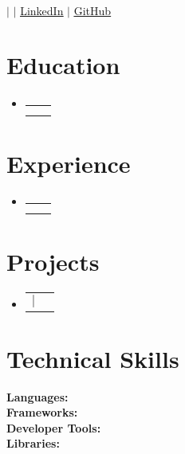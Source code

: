 \documentclass[letterpaper,11pt]{article}
\makeatletter
\newcommand{\resumeProjectHeading}[2]{
  \item
    \begin{tabular*}{0.97\textwidth}[t]{l@{\extracolsep{\fill}}r}
      \small#1 & #2 \\
    \end{tabular*}\vspace{-7pt}
}
\newcommand{\resumeSubheading}[4]{
  \vspace{-2pt}\item
    \begin{tabular*}{0.97\textwidth}[t]{l@{\extracolsep{\fill}}r}
      \textbf{\small#1} & #2 \\
      \textit{\small#3} & \textit{\small #4} \\
    \end{tabular*}\vspace{-7pt}
}
\newcommand{\resumeSubHeadingListStart}{\begin{itemize}[leftmargin=0.15in, label={}]}
\newcommand{\resumeSubHeadingListEnd}{\end{itemize}}
\newcommand{\resumeItemListStart}{\begin{itemize}}
\newcommand{\resumeItemListEnd}{\end{itemize}\vspace{-5pt}}
\makeatother
\begin{document}
\begin{center}
    \textbf{\Huge \scshape {}} \\  \vspace{1pt}
    \small {} $|$ \href{mailto:\VAR{email}}{\underline{}} $|$
    \href{\VAR{linkedin}}{\underline{LinkedIn}} $|$
    \href{\VAR{github}}{\underline{GitHub}}
\end{center}

\section{Education}
\resumeSubHeadingListStart
    \resumeSubheading
      {\VAR{edu.institution}}{\VAR{edu.location}}
      {\VAR{edu.degree}}{\VAR{edu.dates}}
\resumeSubHeadingListEnd


\section{Experience}
\resumeSubHeadingListStart
    \resumeSubheading
      {\VAR{job.title}}{\VAR{job.dates}}
      {\VAR{job.company}}{\VAR{job.location}}
    \resumeItemListStart
    \resumeItemListEnd
\resumeSubHeadingListEnd

\section{Projects}
\resumeSubHeadingListStart
    \resumeProjectHeading
      {\textbf{\VAR{project.name}} $|$ \emph{\VAR{project.tech}}}{\VAR{project.dates}}
      \resumeItemListStart
      \resumeItemListEnd
\resumeSubHeadingListEnd



\section{Technical Skills}
\begin{itemize}[leftmargin=0.15in, label={}]
    \small{\item{
     \textbf{Languages:}  \\ 
     \textbf{Frameworks:}  \\ 
     \textbf{Developer Tools:}  \\ 
     \textbf{Libraries:} 
    }}
\end{itemize}
\end{document}
